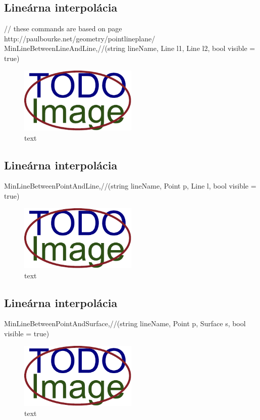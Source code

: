 \subsection{Lineárna interpolácia}

		// these commands are based on page http://paulbourke.net/geometry/pointlineplane/
		MinLineBetweenLineAndLine,//(string lineName, Line l1, Line l2, bool visible = true)

\begin{figure}[H]
	\centering
	\includegraphics[width=0.5\textwidth]{obrazky-figures/placeholder.pdf}
	\caption{text}
	\label{fig:1}
\end{figure}

\subsection{Lineárna interpolácia}
		MinLineBetweenPointAndLine,//(string lineName, Point p, Line l, bool visible = true)

\begin{figure}[H]
	\centering
	\includegraphics[width=0.5\textwidth]{obrazky-figures/placeholder.pdf}
	\caption{text}
	\label{fig:1}
\end{figure}

\subsection{Lineárna interpolácia}
		MinLineBetweenPointAndSurface,//(string lineName, Point p, Surface s, bool visible = true)

\begin{figure}[H]
	\centering
	\includegraphics[width=0.5\textwidth]{obrazky-figures/placeholder.pdf}
	\caption{text}
	\label{fig:1}
\end{figure}


